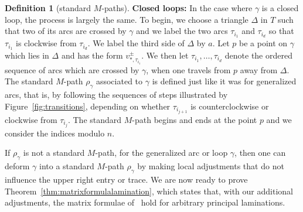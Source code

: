 \documentclass[10pt,a4paper]{amsart}
\numberwithin{equation}{section}
\theoremstyle{definition}
\newtheorem{Definition}[Theorem]{Definition}
\begin{document}
\begin{Definition}[standard $M$-paths]
\textbf{Closed loops:} In the case where $\gamma$ is a closed loop, the process is largely the same. To begin, we choose a triangle $\Delta$ in $T$ such that two of its arcs are crossed by $\gamma$ and we label the two arcs $\tau_{i_1}$ and $\tau_{i_d}$ so that $\tau_{i_1}$ is clockwise from $\tau_{i_d}$. We label the third side of $\Delta$ by $a$. Let $p$ be a point on $\gamma$ which lies in $\Delta$ and has the form $v^{\pm}_{*, \tau_{i_1}}$. We then let $\tau_{i_1}, \ldots,\tau_{i_d}$ denote the ordered sequence of arcs which are crossed by $\gamma$, when one travels from $p$ away from $\Delta$. The standard $M$-path $\rho_{\gamma}$ associated to $\gamma$ is defined just like it was for generalized arcs, that is, by following the sequences of steps illustrated by Figure~\ref{fig:transitions}, depending on whether $\tau_{i_{j+1}}$ is counterclockwise or clockwise from $\tau_{i_j}$. The standard $M$-path begins and ends at the point $p$ and we consider the indices modulo $n$.
\end{Definition}

If $\rho_{\gamma}$ is not a standard $M$-path, for the generalized arc or loop $\gamma$, then one can deform $\gamma$ into a standard $M$-path $\rho_{\gamma}$ by making local adjustments that do not influence the upper right entry or trace.
We are now ready to prove Theorem~\ref{thm:matrixformulalamination}, which states that, with our additional adjustments, the matrix formulae of~\cite{MW13} hold for arbitrary principal laminations.
\end{document}
